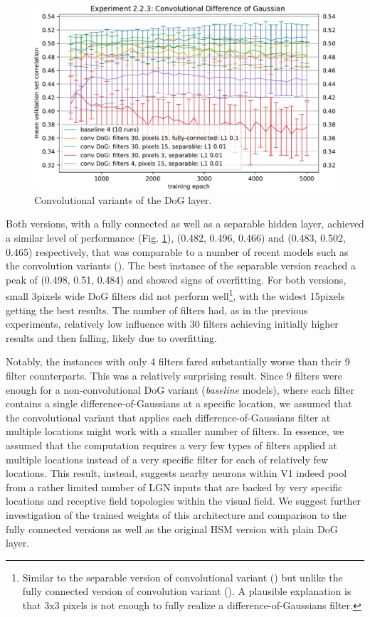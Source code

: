 \begin{figure}[H]
    \centering
    \includegraphics[width=1\textwidth]{../figures/05_2_2_3}
    \caption[Experiment 2.2.3]{Convolutional variants of the DoG layer.}
    \label{fig:5.2.2.3}
\end{figure}

Both versions, with a fully connected as well as a separable hidden layer, achieved a similar level of performance (Fig. \ref{fig:5.2.2.3}), (0.482, 0.496, 0.466) and (0.483, 0.502, 0.465) respectively, that was comparable to a number of recent models such as the convolution variants (). The best instance of the separable version reached a peak of (0.498, 0.51, 0.484) and showed signs of overfitting. For both versions, small 3pixels wide DoG filters did not perform well\footnote{Similar to the {separable version} of {convolutional variant} () but unlike the {fully connected version} of {convolution variant} (). A plausible explanation is that 3x3 pixels is not enough to fully realize a difference-of-Gaussians filter.}, with the widest 15pixels getting the best results. The number of filters had, as in the previous experiments, relatively low influence with 30 filters achieving initially higher results and then falling, likely due to overfitting.

Notably, the instances with only 4 filters fared substantially worse than their 9 filter counterparts. This was a relatively surprising result. Since 9 filters were enough for a {non-convolutional DoG variant} (\textit{baseline} models), where each filter contains a single difference-of-Gaussians at a specific location, we assumed that the {convolutional variant} that applies each difference-of-Gaussians filter at multiple locations might work with a smaller number of filters. In essence, we assumed that the computation requires a very few types of filters applied at multiple locations instead of a very specific filter for each of relatively few locations. This result, instead, suggests nearby neurons within V1 indeed pool from a rather limited number of LGN inputs that are backed by very specific locations and receptive field topologies within the visual field. We suggest further investigation of the trained weights of this architecture and comparison to the fully connected versions as well as the original HSM version with plain DoG layer.

